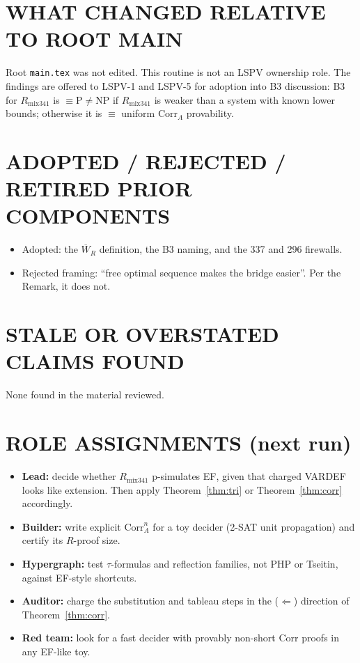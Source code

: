 \documentclass[11pt]{article}
\theoremstyle{definition}\newtheorem{definition}[theorem]{Definition}\newtheorem{remark}[theorem]{Remark}
\begin{document}
\section*{WHAT CHANGED RELATIVE TO ROOT MAIN}
Root \texttt{main.tex} was not edited. This routine is not an LSPV ownership role. The findings are offered to LSPV-1 and LSPV-5 for adoption into B3 discussion: B3 for $R_{\mathrm{mix341}}$ is $\equiv\mathrm P\ne\mathrm{NP}$ if $R_{\mathrm{mix341}}$ is weaker than a system with known lower bounds; otherwise it is $\equiv$ uniform $\mathrm{Corr}_A$ provability.

\section*{ADOPTED / REJECTED / RETIRED PRIOR COMPONENTS}
\begin{itemize}
\item Adopted: the $\overline W_R$ definition, the B3 naming, and the 337 and 296 firewalls.
\item Rejected framing: ``free optimal sequence makes the bridge easier''. Per the Remark, it does not.
\end{itemize}

\section*{STALE OR OVERSTATED CLAIMS FOUND}
None found in the material reviewed.

\section*{ROLE ASSIGNMENTS (next run)}
\begin{itemize}
\item \textbf{Lead:} decide whether $R_{\mathrm{mix341}}$ p-simulates EF, given that charged VARDEF looks like extension. Then apply Theorem~\ref{thm:tri} or Theorem~\ref{thm:corr} accordingly.
\item \textbf{Builder:} write explicit $\mathrm{Corr}_A^n$ for a toy decider (2-SAT unit propagation) and certify its $R$-proof size.
\item \textbf{Hypergraph:} test $\tau$-formulas and reflection families, not PHP or Tseitin, against EF-style shortcuts.
\item \textbf{Auditor:} charge the substitution and tableau steps in the ($\Leftarrow$) direction of Theorem~\ref{thm:corr}.
\item \textbf{Red team:} look for a fast decider with provably non-short $\mathrm{Corr}$ proofs in any EF-like toy.
\end{itemize}
\end{document}
